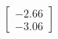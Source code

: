 \documentclass[preview]{standalone}
\begin{document}
\begin{align*}
\begin{bmatrix} -2.66 \\ -3.06 \end{bmatrix}
\end{align*}
\end{document}
